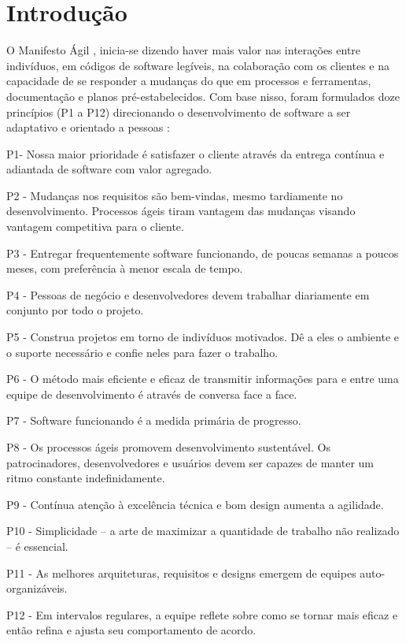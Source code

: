 \section{Introdução}
O Manifesto Ágil \cite{Beck2001}, inicia-se dizendo haver mais valor nas interações entre indivíduos, em códigos de software legíveis, na colaboração com os clientes e na capacidade de se responder a mudanças do que em processos e ferramentas, documentação e planos pré-estabelecidos. Com base nisso, foram formulados doze princípios (P1 a P12) direcionando o desenvolvimento de software a ser adaptativo e orientado a pessoas \cite{Beck2001}: \newline

P1- Nossa maior prioridade é satisfazer o cliente através da entrega contínua e adiantada de software com valor agregado.

P2 - Mudanças nos requisitos são bem-vindas, mesmo tardiamente no desenvolvimento. Processos ágeis tiram vantagem das 
mudanças visando vantagem competitiva para o cliente.

P3 - Entregar frequentemente software funcionando, de poucas semanas a poucos meses, com preferência à menor escala de tempo.

P4 - Pessoas de negócio e desenvolvedores devem trabalhar diariamente em conjunto por todo o projeto.

P5 - Construa projetos em torno de indivíduos motivados. Dê a eles o ambiente e o suporte necessário e confie neles para fazer o trabalho.

P6 - O método mais eficiente e eficaz de transmitir informações para e entre uma equipe de desenvolvimento é através de conversa face a face.

P7 - Software funcionando é a medida primária de progresso.

P8 - Os processos ágeis promovem desenvolvimento sustentável. Os patrocinadores, desenvolvedores e usuários devem ser capazes de manter um ritmo constante indefinidamente.

P9 - Contínua atenção à excelência técnica e bom design aumenta a agilidade.

P10 - Simplicidade -- a arte de maximizar a quantidade de trabalho não realizado -- é essencial.

P11 - As melhores arquiteturas, requisitos e designs emergem de equipes auto-organizáveis.

P12 - Em intervalos regulares, a equipe reflete sobre como se tornar mais eficaz e então refina e ajusta seu comportamento de acordo. \newline

